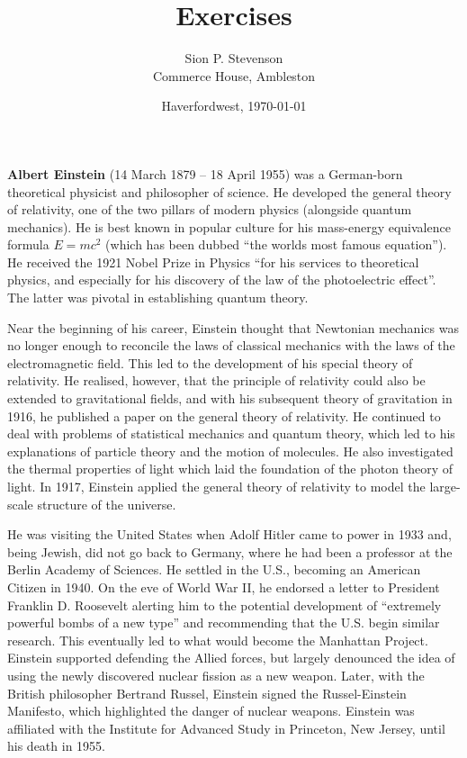 \documentclass[titlepage]{article}
\begin{document}
\title{Exercises}
\author{Sion P. Stevenson\\Commerce House, Ambleston}
\date{Haverfordwest, \today}
\maketitle

\textbf{Albert Einstein} (14 March 1879 -- 18 April 1955) was
a German-born theoretical physicist and philosopher of science. He
developed the general theory of relativity, one of the two pillars
of modern physics (alongside quantum mechanics). He is best known
in popular culture for his mass-energy equivalence formula $E = mc^2$
(which has been dubbed ``the worlds most famous equation''). He received
the 1921 Nobel Prize in Physics ``for his services to theoretical physics,
and especially for his discovery of the law of the photoelectric effect''.
The latter was pivotal in establishing quantum theory.

Near the beginning of his career, Einstein thought that Newtonian
mechan\-ics was no longer enough to reconcile the laws of classical
mechan\-ics with the laws of the electromagnetic field. This led to the
development of his special theory of relativity. He realised, however, that
the principle of relativity could also be extended to gravitational fields,
and with his subsequent theory of gravitation in 1916, he published a paper
on the general theory of relativity. He continued to deal with problems of
statistical mechanics and quantum theory, which led to his explanations of
particle theory and the motion of molecules. He also investigated the
thermal properties of light which laid the foundation of the photon theory
of light. In 1917, Einstein applied the general theory of relativity to
model the large-scale structure of the universe.

He was visiting the United States when Adolf Hitler came to power in 1933
and, being Jewish, did not go back to Germany, where he had been a
professor at the Berlin Academy of Sciences. He settled in the U.S.,
becoming an American Citizen in 1940. On the eve of World War II, he
endorsed a letter to President Franklin D. Roosevelt alerting him to the
potential development of ``extremely powerful bombs of a new type'' and
recommending that the U.S. begin similar research. This eventually led
to what would become the Manhattan Project. Einstein supported defending
the Allied forces, but largely denounced the idea of using the newly 
discovered nuclear fission as a new weapon. Later, with the British
philosopher Bertrand Russel, Einstein signed the Russel-Einstein 
Manifesto, which highlighted the danger of nuclear weapons. Einstein
was affiliated with the Institute for Advanced Study in Princeton,
New Jersey, until his death in 1955.
\end{document}
